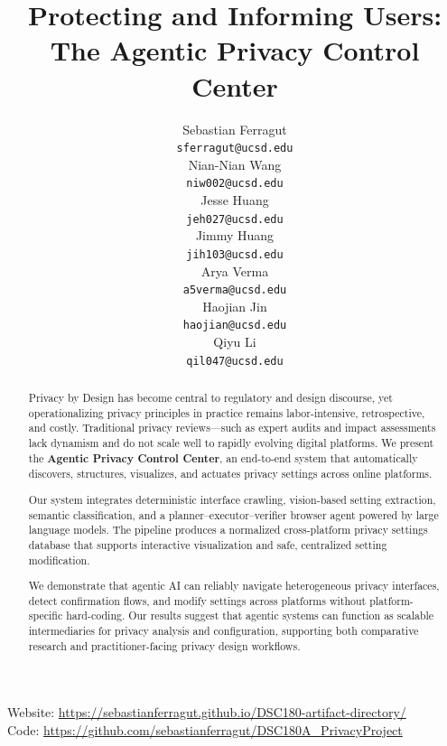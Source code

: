 \documentclass[12pt,letterpaper]{article}
\title{Protecting and Informing Users: The Agentic Privacy Control Center}
\author{Sebastian Ferragut \\
  {\tt sferragut@ucsd.edu} \\\And
  Nian-Nian Wang \\
  {\tt niw002@ucsd.edu} \\\And
  Jesse Huang \\
  {\tt jeh027@ucsd.edu} \\\And
  Jimmy Huang \\
  {\tt jih103@ucsd.edu} \\\And
  Arya Verma \\
  {\tt a5verma@ucsd.edu} \\\And
  Haojian Jin \\
  {\tt haojian@ucsd.edu} \\\And
  Qiyu Li \\
  {\tt qil047@ucsd.edu} \\}
\begin{document}
\maketitle




\begin{abstract}

Privacy by Design has become central to regulatory and design discourse, yet operationalizing privacy principles in practice remains labor-intensive, retrospective, and costly. Traditional privacy reviews—such as expert audits and impact assessments lack dynamism and do not scale well to rapidly evolving digital platforms. We present the \textbf{Agentic Privacy Control Center}, an end-to-end system that automatically discovers, structures, visualizes, and actuates privacy settings across online platforms.

Our system integrates deterministic interface crawling, vision-based setting extraction, semantic classification, and a planner–executor–verifier browser agent powered by large language models. The pipeline produces a normalized cross-platform privacy settings database that supports interactive visualization and safe, centralized setting modification. 

We demonstrate that agentic AI can reliably navigate heterogeneous privacy interfaces, detect confirmation flows, and modify settings across platforms without platform-specific hard-coding. Our results suggest that agentic systems can function as scalable intermediaries for privacy analysis and configuration, supporting both comparative research and practitioner-facing privacy design workflows.

\end{abstract}


Website: \url{https://sebastianferragut.github.io/DSC180-artifact-directory/} \\
Code: \url{https://github.com/sebastianferragut/DSC180A_PrivacyProject}


\maketoc
\clearpage

\end{document}

